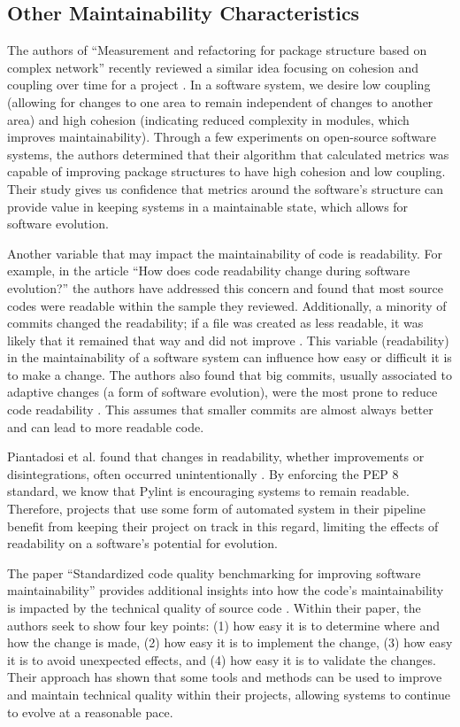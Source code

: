 
\subsection{Other Maintainability Characteristics} \label{subOtherCharacteristics}

The authors of ``Measurement and refactoring for package structure based on complex network'' recently reviewed a similar idea focusing on cohesion and coupling over time for a project \cite{zhou:2020}. In a software system, we desire low coupling (allowing for changes to one area to remain independent of changes to another area) and high cohesion (indicating reduced complexity in modules, which improves maintainability). Through a few experiments on open-source software systems, the authors determined that their algorithm that calculated metrics was capable of improving package structures to have high cohesion and low coupling. Their study gives us confidence that metrics around the software's structure can provide value in keeping systems in a maintainable state, which allows for software evolution.

Another variable that may impact the maintainability of code is readability. For example, in the article ``How does code readability change during software evolution?'' the authors have addressed this concern and found that most source codes were readable within the sample they reviewed. Additionally, a minority of commits changed the readability; if a file was created as less readable, it was likely that it remained that way and did not improve \cite{piantadosi:2020}. This variable (readability) in the maintainability of a software system can influence how easy or difficult it is to make a change. The authors also found that big commits, usually associated to adaptive changes (a form of software evolution), were the most prone to reduce code readability \cite{piantadosi:2020}. This assumes that smaller commits are almost always better and can lead to more readable code.

Piantadosi et al. found that changes in readability, whether improvements or disintegrations, often occurred unintentionally \cite{piantadosi:2020}. By enforcing the PEP 8 standard, we know that Pylint is encouraging systems to remain readable. Therefore, projects that use some form of automated system in their pipeline benefit from keeping their project on track in this regard, limiting the effects of readability on a software's potential for evolution.

The paper ``Standardized code quality benchmarking for improving software maintainability'' provides additional insights into how the code's maintainability is impacted by the technical quality of source code \cite{baggen:2012}. Within their paper, the authors seek to show four key points: (1) how easy it is to determine where and how the change is made, (2) how easy it is to implement the change, (3) how easy it is to avoid unexpected effects, and (4) how easy it is to validate the changes. Their approach has shown that some tools and methods can be used to improve and maintain technical quality within their projects, allowing systems to continue to evolve at a reasonable pace.
